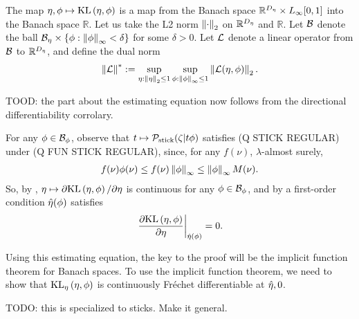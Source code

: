 %
The map $\eta, \phi \mapsto \mathrm{KL}\left(\eta, \phi\right)$ is a map from the Banach space
$\mathbb{R}^{D_{\eta}} \times {L_{\infty}[0,1]}$ into the Banach space $\mathbb{R}$. Let us
take the L2 norm $\left\Vert\cdot\right\Vert_2$ on $\mathbb{R}^{{D_{\eta}}}$ and $\mathbb{R}$.
Let $\mathcal{B}$ denote the ball $\mathcal{B}_\eta \times \{ \phi: \left\Vert\phi\right\Vert_{\infty} <
\delta\}$ for some $\delta > 0$.  Let $\mathcal{L}$ denote a linear operator from
$\mathcal{B}$ to $\mathbb{R}^{D_{\eta}}$, and define the dual norm
%
\begin{align*}
%
\norm{\linop}^* :=
    \sup_{\eta: \norm{\eta}_2 \le 1} \sup_{\phi: \norminf{\phi} \le 1}
     \norm{\linop(\eta, \phi)}_2.
%
\end{align*}

TOOD: the part about the estimating equation now follows from the directional
differentiability corrolary.

For any $\phi \in \mathcal{B}_\phi$, observe that $t \mapsto \mathcal{P}_{\mathrm{stick}}(\zeta \vert t
\phi)$ satisfies (Q STICK REGULAR) under (Q FUN STICK REGULAR),
since, for any $f(\nu)$, $\lambda$-almost surely,
%
\begin{align*}
%
f(\nu) \phi(\nu) \le f(\nu) \norminf{\phi} \le \norminf{\phi} M(\nu).
%
\end{align*}
%
So, by , $\eta \mapsto \partial \mathrm{KL}\left(\eta, \phi\right) /
\partial \eta$ is continuous for any $\phi \in \mathcal{B}_\phi$, and by a first-order
condition $\hat\eta(\phi)$ satisfies
%
\begin{align*}
%
\fracat{\partial \KL{\eta, \phi}}
                {\partial \eta}
                {\etaopt(\phi)} = 0.
%
\end{align*}


Using this estimating equation, the key to the proof will be the implicit
function theorem for Banach spaces. To use the implicit function theorem, we
need to show that $\mathrm{KL}_{\eta}\left(\eta, \phi\right)$ is continuously Fr{\'e}chet
differentiable at $\hat\eta, 0$.


TODO: this is specialized to sticks.  Make it general.

